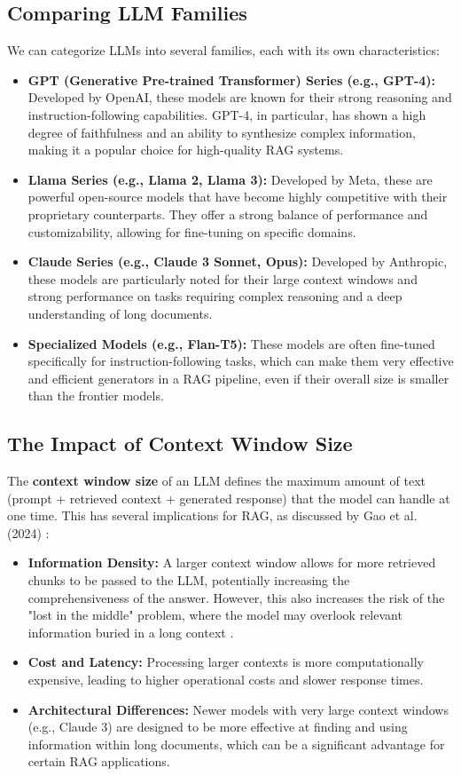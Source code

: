 \subsection{Comparing LLM Families}
We can categorize LLMs into several families, each with its own characteristics:
\begin{itemize}
    \item \textbf{GPT (Generative Pre-trained Transformer) Series (e.g., GPT-4):} Developed by OpenAI, these models are known for their strong reasoning and instruction-following capabilities. GPT-4, in particular, has shown a high degree of faithfulness and an ability to synthesize complex information, making it a popular choice for high-quality RAG systems.
    \item \textbf{Llama Series (e.g., Llama 2, Llama 3):} Developed by Meta, these are powerful open-source models that have become highly competitive with their proprietary counterparts. They offer a strong balance of performance and customizability, allowing for fine-tuning on specific domains.
    \item \textbf{Claude Series (e.g., Claude 3 Sonnet, Opus):} Developed by Anthropic, these models are particularly noted for their large context windows and strong performance on tasks requiring complex reasoning and a deep understanding of long documents.
    \item \textbf{Specialized Models (e.g., Flan-T5):} These models are often fine-tuned specifically for instruction-following tasks, which can make them very effective and efficient generators in a RAG pipeline, even if their overall size is smaller than the frontier models.
\end{itemize}

\subsection{The Impact of Context Window Size}
The \textbf{context window size} of an LLM defines the maximum amount of text (prompt + retrieved context + generated response) that the model can handle at one time. This has several implications for RAG, as discussed by Gao et al. (2024) \autocite{gao2024retrievalaugmented}:
\begin{itemize}
    \item \textbf{Information Density:} A larger context window allows for more retrieved chunks to be passed to the LLM, potentially increasing the comprehensiveness of the answer. However, this also increases the risk of the "lost in the middle" problem, where the model may overlook relevant information buried in a long context \autocite{liu2023lost}.
    \item \textbf{Cost and Latency:} Processing larger contexts is more computationally expensive, leading to higher operational costs and slower response times.
    \item \textbf{Architectural Differences:} Newer models with very large context windows (e.g., Claude 3) are designed to be more effective at finding and using information within long documents, which can be a significant advantage for certain RAG applications.
\end{itemize}

